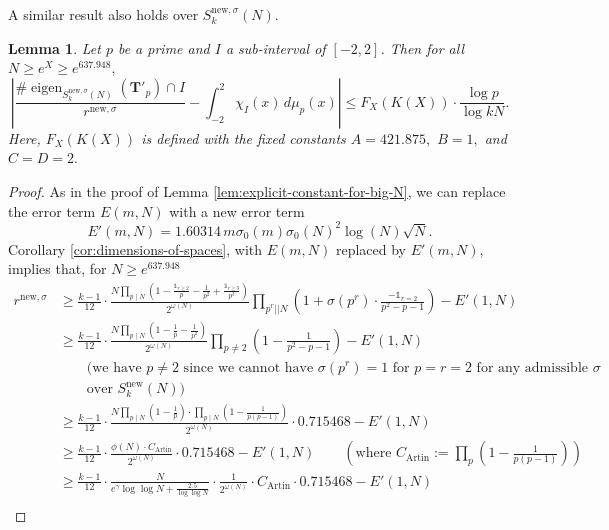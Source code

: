 \documentclass[11pt,letterpaper,reqno]{amsart}
\newtheorem{lemma}[theorem]{Lemma}
\theoremstyle{definition}
\numberwithin{equation}{section}
\numberwithin{figure}{section}
\numberwithin{table}{section}
\newcommand{\lrp}[1]{\left(#1\right)}
\newcommand{\nw}{\mathrm{new}}
\begin{document}
A similar result also holds over $S_k^{\nw, \sigma}(N).$

\begin{lemma}\label{lem:explicit-constant-for-big-N-newspace}  
    Let $p$ be a prime and $I$ a sub-interval of $[-2, 2]$. Then for all $N \geq e^X \geq e^{637.948},$
        $$\left| \frac{\# \operatorname{eigen}_{S_k^{\nw, \sigma}(N)}(\mathbf{T}'_p) \cap I}{r^{\nw, \sigma}} - \int_{-2}^2 \chi_I(x) \, d \mu_p(x)  \right| \leq F_{X}\left( K(X)  \right) \cdot \frac{\log p}{\log kN}.$$
    Here, $F_X(K(X))$ is defined with the fixed constants $A = 421.875,$ $B = 1,$ and $C = D = 2.$
\end{lemma}

\begin{proof}
    As in the proof of Lemma \ref{lem:explicit-constant-for-big-N}, we can replace the error term $E(m, N)$ with a new error term
    $$E'(m, N) = 1.60314 \, m \sigma_0(m) \sigma_0(N)^2 \log (N) \sqrt{N}.$$
    Corollary \ref{cor:dimensions-of-spaces}, with $E(m, N)$ replaced by $E'(m, N)$, implies that, for $N \geq e^{637.948}$
    \begin{align}
        r^{\nw, \sigma} &\geq \frac{k - 1}{12} \cdot \frac{N \prod_{p \mid N} \left(1 - \frac{\mathds{1}_{r \geq 2}}{p} -  \frac{1}{p^2}   +  \frac{\mathds{1}_{r \geq 3}}{p^3}  \right)}{2^{\omega(N)}} \prod_{p^r || N} \left( 1 + \sigma(p^r) \cdot \frac{-\mathds{1}_{r = 2}}{p^2 - p - 1}  \right) - E'(1, N)\\
        &\geq \frac{k - 1}{12} \cdot \frac{N \prod_{p \mid N} \left(1 - \frac{1}{p} - \frac{1}{p^2} \right)}{2^{\omega(N)}} \prod_{p \neq 2} \left( 1 - \frac{1}{p^2 - p - 1}  \right) - E'(1, N)\\
        &\qquad \text{(we have $p \neq 2$ since we cannot have $\sigma(p^r) = 1$ for $p = r = 2$ for any admissible $\sigma$}\\
        & \qquad \text{over $S_k^{\nw}(N)$)}\\
        &\geq \frac{k - 1}{12} \cdot \frac{N \prod_{p \mid N} \left(1 - \frac{1}{p} \right) \cdot \prod_{p \mid N} \left(1 - \frac{1}{p(p - 1)} \right)}{2^{\omega(N)}} \cdot 0.715468 - E'(1, N)\\
        &\geq \frac{k - 1}{12} \cdot \frac{\phi(N) \cdot C_{\text{Artin}}}{2^{\omega(N)}} \cdot 0.715468 - E'(1, N) \qquad \left( \text{where } C_{\text{Artin}} := \prod_p \lrp{1 - \frac{1}{p(p-1)}} \right)\\
        &\geq \frac{k - 1}{12} \cdot \frac{N}{e^{\gamma} \log\log N + \frac{2.5}{\log \log N}} \cdot \frac{1}{2^{\omega(N)}} \cdot C_{\text{Artin}} \cdot  0.715468 - E'(1, N)\\

\end{align}
\end{proof}
\end{document}
